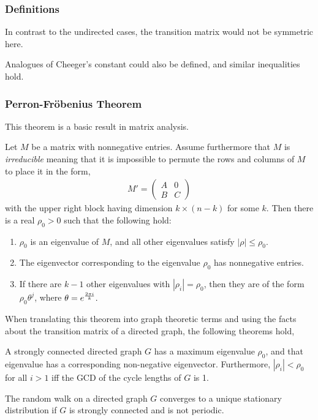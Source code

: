 \subsubsection{Definitions}
In contrast to the undirected cases, the transition matrix would not be symmetric
here.

Analogues of Cheeger's constant could also be defined, and similar inequalities
hold.

\subsubsection{Perron-Fr\"obenius Theorem}
This theorem is a basic result in matrix analysis.

\begin{theorem}
Let $M$ be a matrix with nonnegative entries. Assume furthermore that $M$ is
\emph{irreducible} meaning that it is impossible to permute the rows and columns of
$M$ to place it in the form,
\begin{eqnarray*}
M'=\left(
\begin{array}{cc}
A & 0\\
B & C
\end{array}
\right)
\end{eqnarray*}
with the upper right block having dimension $k\times (n-k)$ for some $k$. Then there
is a real $\rho_0>0$ such that the following hold:
\begin{enumerate}[1.]
\item $\rho_0$ is an eigenvalue of $M$, and all other eigenvalues satisfy $|\rho|\le
\rho_0$.
\item The eigenvector corresponding to the eigenvalue $\rho_0$ has nonnegative
entries.
\item If there are $k-1$ other eigenvalues with $|\rho_i|=\rho_0$, then they are of
the form $\rho_0\theta^j$, where $\theta=e^{2\pi i\over k}.$
\end{enumerate}

\end{theorem}

When translating this theorem into graph theoretic terms and using the facts about
the transition matrix of a directed graph, the following theorems hold,
\begin{theorem}
A strongly connected directed graph $G$ has a maximum eigenvalue $\rho_0$, and that
eigenvalue has a corresponding non-negative eigenvector. Furthermore,
$|\rho_i|<\rho_0$ for all $i>1$ iff the GCD of the cycle lengths of $G$ is 1.
\end{theorem}

\begin{theorem}
The random walk on a directed graph $G$ converges to a unique stationary
distribution if $G$ is strongly connected and is not periodic.
\end{theorem}
